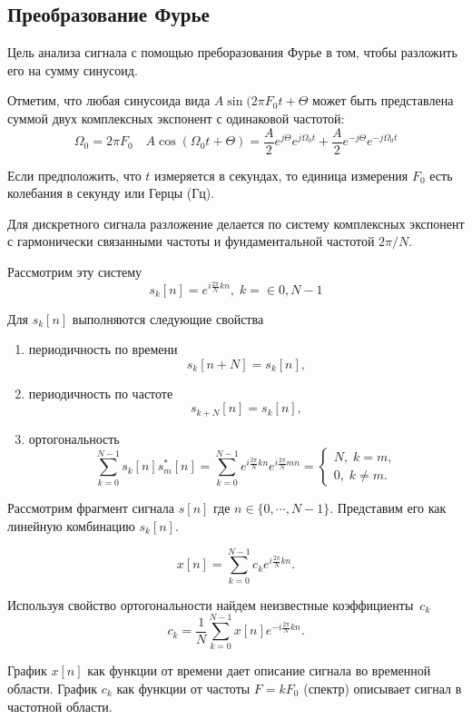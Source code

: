 \documentclass[oneside, final, 12pt]{extarticle}
\begin{document}
\subsection{Преобразование Фурье}
  Цель анализа сигнала с помощью преборазования Фурье
  в том, чтобы разложить его на сумму синусоид.

  Отметим, что любая синусоида вида $A \sin (2 \pi F_0 t + \Theta$
  может быть представлена суммой двух комплексных экспонент с одинаковой
  частотой:
  \[
    \Omega_0 = 2 \pi F_0 \quad
    A \cos(\Omega_0 t + \Theta) =
    \frac{A}{2} e^{j\Theta} e^{j\Omega_0 t} +
    \frac{A}{2} e^{-j\Theta} e^{-j\Omega_0 t}
  \]

  Если предположить, что $t$ измеряется в секундах, то единица измерения
  $F_0$ есть колебания в секунду или Герцы (Гц).

  Для дискретного сигнала разложение делается по систему
  комплексных экспонент с гармонически связанными частоты и
  фундаментальной частотой $2 \pi / N$.

  Рассмотрим эту систему
  \[
    s_k[n]=e^{i\tfrac{2\pi}{N}kn}, \; k=\in{0,N-1}
  \]

  Для $s_k[n]$ выполняются следующие свойства

  \begin{enumerate}
  \item периодичность по времени \[
    s_k[n + N] = s_k[n],
  \]
  \item периодичность по частоте
  \[
    s_{k+N}[n] = s_k[n],
  \]
  \item ортогональность
  \[
    \sum_{k=0}^{N-1} s_k[n]s_m^*[n] =
    \sum_{k=0}^{N-1} e^{i\tfrac{2\pi}{N}kn} e^{i\tfrac{2\pi}{N}mn} =
    \left\{ \begin{aligned}
        N, \; k = m ,\\
        0, \; k \not= m.
      \end{aligned}
    \right.
  \]
  \end{enumerate}

  Рассмотрим фрагмент сигнала $s[n]$ где $n \in \{0,\cdots,N-1\}$.
  Представим его как линейную комбинацию $s_k[n]$.

  \[
    x[n] = \sum_{k=0}^{N-1} c_k e^{i\tfrac{2\pi}{N}kn}.
  \]

  Используя свойство ортогональности найдем неизвестные коэффициенты~$c_k$
  \[
    c_k = \dfrac{1}{N} \sum_{k=0}^{N-1} x[n] e^{-i\tfrac{2\pi}{N}kn}.
  \]

  График $x[n]$ как функции от времени дает описание сигнала во временной
  области. График $c_k$ как функции от частоты $F = k F_0$ (спектр)
  описывает сигнал в частотной области.
\end{document}
